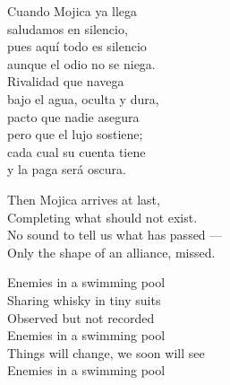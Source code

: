 \begin{lyrics}
Cuando Mojica ya llega\\
saludamos en silencio,\\
pues aquí todo es silencio\\
aunque el odio no se niega.\\
Rivalidad que navega\\
bajo el agua, oculta y dura,\\
pacto que nadie asegura\\
pero que el lujo sostiene;\\
cada cual su cuenta tiene\\
y la paga será oscura.

Then Mojica arrives at last,\\
Completing what should not exist.\\
No sound to tell us what has passed —\\
Only the shape of an alliance, missed.

Enemies in a swimming pool\\
Sharing whisky in tiny suits\\
Observed but not recorded\\
Enemies in a swimming pool\\
Things will change, we soon will see\\
Enemies in a swimming pool
\end{lyrics}
